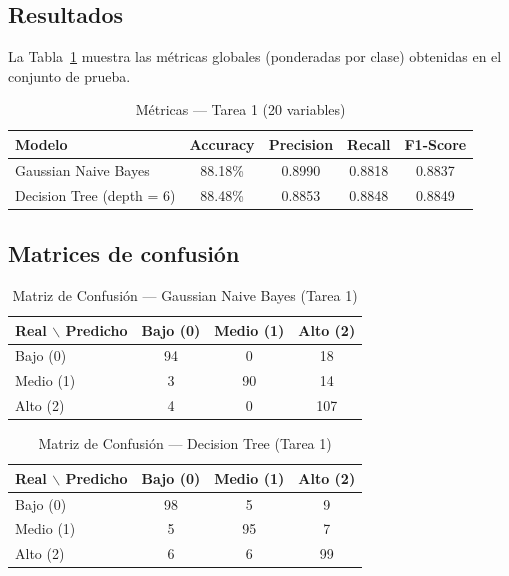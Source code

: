 \documentclass[12pt, letterpaper]{article}
\begin{document}
\subsection{Resultados}

La Tabla~\ref{tab:tarea1} muestra las métricas globales (ponderadas por clase)
obtenidas en el conjunto de prueba.

\begin{table}[H]
    \centering
    \caption{Métricas — Tarea 1 (20 variables)}
    \label{tab:tarea1}
    \begin{tabular}{lcccc}
        \toprule
        \textbf{Modelo} & \textbf{Accuracy} & \textbf{Precision} &
        \textbf{Recall} & \textbf{F1-Score} \\
        \midrule
        \rowcolor{rowgray}
        Gaussian Naive Bayes       & 88.18\% & 0.8990 & 0.8818 & 0.8837 \\
        Decision Tree (depth = 6)  & 88.48\% & 0.8853 & 0.8848 & 0.8849 \\
        \bottomrule
    \end{tabular}
\end{table}

\subsection{Matrices de confusión}

\begin{table}[H]
    \centering
    \caption{Matriz de Confusión — Gaussian Naive Bayes (Tarea 1)}
    \label{tab:cm_gnb_t1}
    \begin{tabular}{lccc}
        \toprule
        \textbf{Real $\backslash$ Predicho} & \textbf{Bajo (0)} &
        \textbf{Medio (1)} & \textbf{Alto (2)} \\
        \midrule
        \rowcolor{rowgray} Bajo (0)  &  94 &  0 & 18 \\
        Medio (1)                    &   3 & 90 & 14 \\
        \rowcolor{rowgray} Alto (2)  &   4 &  0 & 107 \\
        \bottomrule
    \end{tabular}
\end{table}

\begin{table}[H]
    \centering
    \caption{Matriz de Confusión — Decision Tree (Tarea 1)}
    \label{tab:cm_dt_t1}
    \begin{tabular}{lccc}
        \toprule
        \textbf{Real $\backslash$ Predicho} & \textbf{Bajo (0)} &
        \textbf{Medio (1)} & \textbf{Alto (2)} \\
        \midrule
        \rowcolor{rowgray} Bajo (0)  & 98 &  5 &  9 \\
        Medio (1)                    &  5 & 95 &  7 \\
        \rowcolor{rowgray} Alto (2)  &  6 &  6 & 99 \\
        \bottomrule
    \end{tabular}
\end{table}
\end{document}
